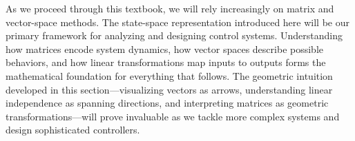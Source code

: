 As we proceed through this textbook, we will rely increasingly on matrix and vector-space methods. The state-space representation introduced here will be our primary framework for analyzing and designing control systems. Understanding how matrices encode system dynamics, how vector spaces describe possible behaviors, and how linear transformations map inputs to outputs forms the mathematical foundation for everything that follows. The geometric intuition developed in this section---visualizing vectors as arrows, understanding linear independence as spanning directions, and interpreting matrices as geometric transformations---will prove invaluable as we tackle more complex systems and design sophisticated controllers.
